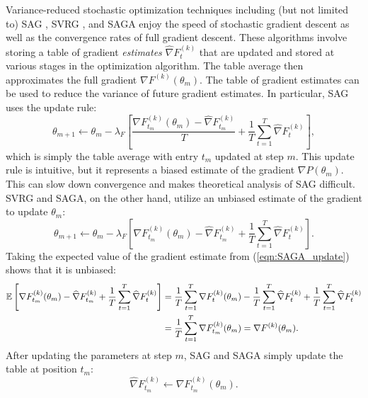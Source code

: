 Variance-reduced stochastic optimization techniques including (but not limited to) SAG \citep{Schmidt:2017}, SVRG \citep{Johnson:2013}, and SAGA \citep{Defazio:2014} enjoy the speed of stochastic gradient descent as well as the convergence rates of full gradient descent. These algorithms involve storing a table of gradient \textit{estimates} $\widehat \nabla F^{(k)}_t$ that are updated and stored at various stages in the optimization algorithm. The table average then approximates the full gradient $\nabla F^{(k)}(\theta_{m})$. The table of gradient estimates can be used to reduce the variance of future gradient estimates. In particular, SAG uses the update rule:
%
\begin{equation}
    \theta_{m+1} \gets \theta_{m} - \lambda_F \left[\frac{\nabla F^{(k)}_{t_m}(\theta_{m}) - \widehat \nabla F^{(k)}_{t_m}}{T} + \frac{1}{T} \sum_{t=1}^T \widehat \nabla F^{(k)}_{t} \right], \label{eqn:SAG_update}
\end{equation}
%
which is simply the table average with entry $t_m$ updated at step $m$. This update rule is intuitive, but it represents a biased estimate of the gradient $\nabla P(\theta_m)$. This can slow down convergence and makes theoretical analysis of SAG difficult. SVRG and SAGA, on the other hand, utilize an unbiased estimate of the gradient to update $\theta_m$:
%
\begin{equation}
    \theta_{m+1} \gets \theta_{m} - \lambda_F \left[\nabla F^{(k)}_{t_m}(\theta_{m}) - \widehat \nabla F^{(k)}_{t_m} + \frac{1}{T} \sum_{t=1}^T \widehat \nabla F^{(k)}_{t} \right].
    \label{eqn:SAGA_update}
\end{equation}
%
Taking the expected value of the gradient estimate from (\ref{eqn:SAGA_update}) shows that it is unbiased:
%
\begin{align*}
    \mathbb{E}\left[\nabla F^{(k)}_{t_m}(\theta_{m}) - \widehat \nabla F^{(k)}_{t_m} + \frac{1}{T} \sum_{t=1}^T \widehat \nabla F^{(k)}_{t} \right] &= \frac{1}{T} \sum_{t=1}^T \nabla F^{(k)}_{t}(\theta_{m}) - \frac{1}{T} \sum_{t=1}^T \widehat \nabla F^{(k)}_{t} + \frac{1}{T} \sum_{t=1}^T \widehat \nabla F^{(k)}_{t} \\
    &= \frac{1}{T} \sum_{t=1}^T \nabla F^{(k)}_{t_m}(\theta_{m}) = \nabla F^{(k)}(\theta_{m}).
\end{align*}
%
After updating the parameters at step $m$, SAG and SAGA simply update the table at position $t_m$: 
%
\begin{equation}
    \widehat \nabla F^{(k)}_{t_m} \leftarrow \nabla F^{(k)}_{t_m}(\theta_{m}).
\end{equation}
